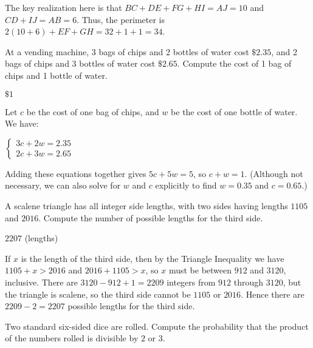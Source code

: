 \documentclass[11pt]{article}
\begin{document}
\begin{solution}
The key realization here is that $BC+DE+FG+HI = AJ = 10$ and $CD+IJ = AB = 6$. Thus, the perimeter is $2(10+6) + EF+GH=32 + 1 + 1 = \boxed{34}$.
\end{solution}


\begin{problem}
At a vending machine, 3 bags of chips and 2 bottles of water cost $\$2.35$, and 2 bags of chips and 3 bottles of water cost $\$2.65$. Compute the cost of 1 bag of chips and 1 bottle of water.
\end{problem}

\begin{answer}
$\boxed{\$1}$
\end{answer}

\begin{solution}
Let $c$ be the cost of one bag of chips, and $w$ be the cost of one bottle of water. We have: \begin{center}$\begin{cases} 3c + 2w = 2.35 \\ 2c + 3w = 2.65 \end{cases}$\end{center} Adding these equations together gives $5c + 5w = 5$, so $c + w = \boxed{1}$. (Although not necessary, we can also solve for $w$ and $c$ explicitly to find $w = 0.35$ and $c = 0.65$.)
\end{solution}


\begin{problem}
A scalene triangle has all integer side lengths, with two sides having lengths $1105$ and $2016$. Compute the number of possible lengths for the third side.
\end{problem}

\begin{answer}
$\boxed{2207}$ (lengths)
\end{answer}

\begin{solution}
If $x$ is the length of the third side, then by the Triangle Inequality we have $1105 + x > 2016$ and $2016 + 1105 > x$, so $x$ must be between $912$ and $3120$, inclusive. There are $3120 - 912 + 1 = 2209$ integers from $912$ through $3120$, but the triangle is scalene, so the third side cannot be $1105$ or $2016$. Hence there are $2209 - 2 = \boxed{2207}$ possible lengths for the third side.
\end{solution}


\begin{problem}
Two standard six-sided dice are rolled. Compute the probability that the product of the numbers rolled is divisible by $2$ or $3$.
\end{problem}
\end{document}

